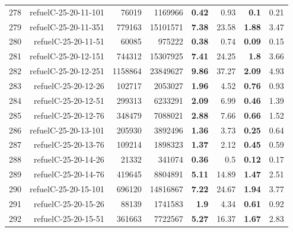 \begin{longtable}{lrr@{\hskip 12pt}r@{\hskip 12pt}r@{\hskip 12pt}r@{\hskip 12pt}r@{\hskip 12pt}r}
278 & \multirow{1}{*}{refuelC-25-20-11-101} & \multirow{1}{*}{76019} & \multirow{1}{*}{1169966} & \textbf{0.42} & 0.93 & \textbf{0.1} & 0.21 \\
279 & \multirow{1}{*}{refuelC-25-20-11-351} & \multirow{1}{*}{779163} & \multirow{1}{*}{15101571} & \textbf{7.38} & 23.58 & \textbf{1.88} & 3.47 \\
280 & \multirow{1}{*}{refuelC-25-20-11-51} & \multirow{1}{*}{60085} & \multirow{1}{*}{975222} & \textbf{0.38} & 0.74 & \textbf{0.09} & 0.15 \\
281 & \multirow{1}{*}{refuelC-25-20-12-151} & \multirow{1}{*}{744312} & \multirow{1}{*}{15307925} & \textbf{7.41} & 24.25 & \textbf{1.8} & 3.66 \\
282 & \multirow{1}{*}{refuelC-25-20-12-251} & \multirow{1}{*}{1158864} & \multirow{1}{*}{23849627} & \textbf{9.86} & 37.27 & \textbf{2.09} & 4.93 \\
283 & \multirow{1}{*}{refuelC-25-20-12-26} & \multirow{1}{*}{102717} & \multirow{1}{*}{2053027} & \textbf{1.96} & 4.52 & \textbf{0.76} & 0.93 \\
284 & \multirow{1}{*}{refuelC-25-20-12-51} & \multirow{1}{*}{299313} & \multirow{1}{*}{6233291} & \textbf{2.09} & 6.99 & \textbf{0.46} & 1.39 \\
285 & \multirow{1}{*}{refuelC-25-20-12-76} & \multirow{1}{*}{348479} & \multirow{1}{*}{7088021} & \textbf{2.88} & 7.66 & \textbf{0.66} & 1.52 \\
286 & \multirow{1}{*}{refuelC-25-20-13-101} & \multirow{1}{*}{205930} & \multirow{1}{*}{3892496} & \textbf{1.36} & 3.73 & \textbf{0.25} & 0.64 \\
287 & \multirow{1}{*}{refuelC-25-20-13-76} & \multirow{1}{*}{109214} & \multirow{1}{*}{1898323} & \textbf{1.37} & 2.12 & \textbf{0.45} & 0.59 \\
288 & \multirow{1}{*}{refuelC-25-20-14-26} & \multirow{1}{*}{21332} & \multirow{1}{*}{341074} & \textbf{0.36} & 0.5 & \textbf{0.12} & 0.17 \\
289 & \multirow{1}{*}{refuelC-25-20-14-76} & \multirow{1}{*}{419645} & \multirow{1}{*}{8804891} & \textbf{5.11} & 14.89 & \textbf{1.47} & 2.51 \\
290 & \multirow{1}{*}{refuelC-25-20-15-101} & \multirow{1}{*}{696120} & \multirow{1}{*}{14816867} & \textbf{7.22} & 24.67 & \textbf{1.94} & 3.77 \\
291 & \multirow{1}{*}{refuelC-25-20-15-26} & \multirow{1}{*}{88139} & \multirow{1}{*}{1741583} & \textbf{1.9} & 4.34 & \textbf{0.61} & 0.92 \\
292 & \multirow{1}{*}{refuelC-25-20-15-51} & \multirow{1}{*}{361663} & \multirow{1}{*}{7722567} & \textbf{5.27} & 16.37 & \textbf{1.67} & 2.83 \\

\end{longtable}
